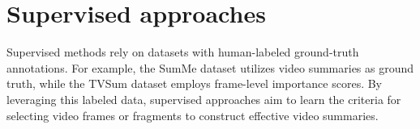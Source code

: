 \label{section:rel-supervised}
\section{Supervised approaches} 
Supervised methods rely on datasets with human-labeled ground-truth annotations. For example, the SumMe dataset \cite{SumMe} utilizes video summaries as ground truth, while the TVSum dataset \cite{TVSum} employs frame-level importance scores. By leveraging this labeled data, supervised approaches aim to learn the criteria for selecting video frames or fragments to construct effective video summaries.





